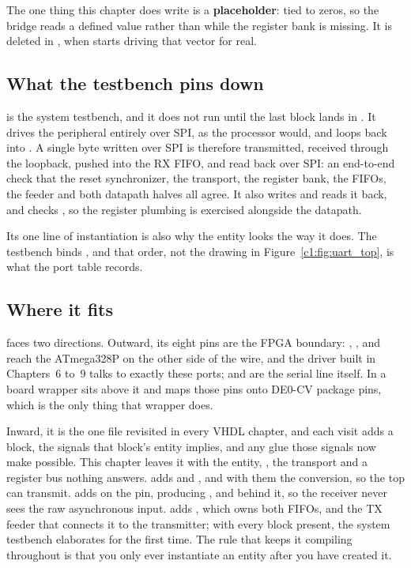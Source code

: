 The one thing this chapter does write is a \textbf{placeholder}:  tied to zeros, so
the bridge reads a defined value rather than  while the register bank is missing. It is
deleted in , when  starts driving that vector for real.

\subsection{What the testbench pins down}
\label{c1:sec:uart_top_tb}
 is the system testbench, and it does not run until the last block lands in
. It drives the peripheral entirely over SPI, as the processor would, and loops 
back into . A single byte written over SPI is therefore transmitted, received through the
loopback, pushed into the RX FIFO, and read back over SPI: an end-to-end check that the reset
synchronizer, the transport, the register bank, the FIFOs, the feeder and both datapath halves all
agree. It also writes  and reads it back, and checks , so the register
plumbing is exercised alongside the datapath.

Its one line of instantiation is also why the entity looks the way it does. The testbench binds
, and that order, not the drawing in
Figure~\ref{c1:fig:uart_top}, is what the port table records.

\subsection{Where it fits}
\label{c1:sec:uart_top_fits}
 faces two directions. Outward, its eight pins are the FPGA boundary: ,
,  and  reach the ATmega328P on the other side of the wire, and the
driver built in Chapters~6 to~9 talks to exactly these ports;  and  are the
serial line itself. In  a board wrapper sits above it and maps those pins onto DE0-CV
package pins, which is the only thing that wrapper does.

Inward, it is the one file revisited in every VHDL chapter, and each visit adds a block, the
signals that block's entity implies, and any glue those signals now make possible. This chapter
leaves it with the entity, , the transport and a register bus nothing answers.
 adds  and , and with them the  conversion,
so the top can transmit.  adds  on the  pin, producing ,
and  behind it, so the receiver never sees the raw asynchronous input. 
adds , which owns both FIFOs, and the TX feeder that connects it to the transmitter;
with every block present, the system testbench elaborates for the first time. The rule that keeps
it compiling throughout is that you only ever instantiate an entity after you have created it.


